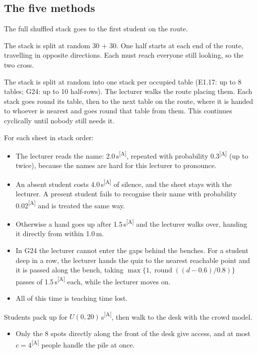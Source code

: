 \documentclass[11pt,a4paper]{article}
\newcommand{\assume}{\textcolor{flag}{\textsuperscript{[A]}}}
\begin{document}
\subsection{The five methods}
\begin{description}[style=nextline]
  \item[1. One stack] The full shuffled stack goes to the first student on the route.
  \item[2. Two stacks] The stack is split at random 30 + 30. One half starts at each end of the route, travelling in opposite directions. Each must reach everyone still looking, so the two cross.
  \item[3. One stack per table] The stack is split at random into one stack per occupied table (E1.17: up to 8 tables; G24: up to 10 half-rows). The lecturer walks the route placing them. Each stack goes round its table, then to the next table on the route, where it is handed to whoever is nearest and goes round that table from them. This continues cyclically until nobody still needs it.
  \item[4. Calling names] For each sheet in stack order:
  \begin{itemize}
    \item The lecturer reads the name: 2.0\,s\assume, repeated with probability 0.3\assume{} (up to twice), because the names are hard for this lecturer to pronounce.
    \item An absent student costs 4.0\,s\assume{} of silence, and the sheet stays with the lecturer. A present student fails to recognise their name with probability 0.02\assume{} and is treated the same way.
    \item Otherwise a hand goes up after 1.5\,s\assume{} and the lecturer walks over, handing it directly from within 1.0\,m.
    \item In G24 the lecturer cannot enter the gaps behind the benches. For a student deep in a row, the lecturer hands the quiz to the nearest reachable point and it is passed along the bench, taking $\max\{1,\operatorname{round}((d-0.6)/0.8)\}$ passes of 1.5\,s\assume{} each, while the lecturer moves on.
    \item All of this time is teaching time lost.
  \end{itemize}
  \item[5. Pile on the desk, after class] Students pack up for $U(0,20)$\,s\assume, then walk to the desk with the crowd model.
  \begin{itemize}
    \item Only the 8 spots directly along the front of the desk give access, and at most $c=4$\assume{} people handle the pile at once.

\end{itemize}
\end{description}
\end{document}
